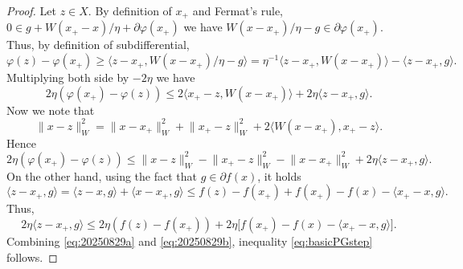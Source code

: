 \documentclass[10pt,a4paper]{amsart}
\newcommand{\HH}{X}
\newcommand{\W}{W}
\newcommand{\norm}[1]{\lVert{#1}\rVert}
\newcommand{\pair}[2]{{\langle{{#1},{#2}}\rangle}}
\newcommand{\reg}{\varphi}
\newcommand{\scalarp}[1]{\langle{#1}\rangle}
\newcommand{\uu}{g}
\newcommand{\x}{x}
\begin{document}
\begin{proof}
Let $z\in X$.
By definition of $x_+$ and Fermat's rule, $0\in \uu + \W(\x_+-\x)/\eta +  \partial \reg(\x_+)$
we have $\W(x-x_+)/\eta - \uu\in \partial \reg(x_+)$. Thus, by definition of subdifferential,
\begin{equation*}
\reg(z)-\reg(x_+) \geq \pair{z-x_+}{\W(x-x_+)/\eta - \uu} = \eta^{-1}\pair{z-x_+}{\W(x-x_+)}
-\pair{z-x_+}{\uu}.
\end{equation*}
Multiplying both side by $-2\eta$ we have
\begin{equation*}
2\eta(\reg(x_+)-\reg(z)) \leq  2\pair{x_+-z}{\W(x-x_+)}
+2\eta\pair{z-x_+}{\uu}.
\end{equation*}
Now we note that
\begin{equation*}
\norm{\x- z}_{\W}^2 = \norm{\x - x_+}_{\W}^2 + \norm{\x_+-z}_{\W}^2 +2\pair{\W(\x-x_+)}{\x_+-z}.
\end{equation*}
Hence
\begin{equation}
\label{eq:20250829a}
2\eta(\reg(\x_+)-\reg(z)) \leq  \norm{\x- z}_{\W}^2 - \norm{\x_+-z}_{\W}^2 -\norm{\x - \x_+}_{\W}^2 
+2\eta\pair{z-x_+}{\uu}.
\end{equation}
On the other hand, using the fact that $\uu \in \partial f(\x)$, it holds
\begin{equation*}
\pair{z-\x_+}{\uu} = \pair{z-\x}{\uu} + \pair{\x-\x_+}{\uu}
\leq f(z)-f(\x_+) + f(\x_+)- f(\x) - \pair{\x_+-\x}{\uu}.
\end{equation*}
Thus, 
\begin{equation}
\label{eq:20250829b}
2\eta \pair{z-\x_+}{\uu} \leq 2\eta (f(z)-f(\x_+)) + 2 \eta \big[f(\x_+)- f(\x) - \pair{\x_+-\x}{\uu}\big].
\end{equation}
Combining \eqref{eq:20250829a} and \eqref{eq:20250829b}, inequality \eqref{eq:basicPGstep} follows.
%

\end{proof}
\end{document}
